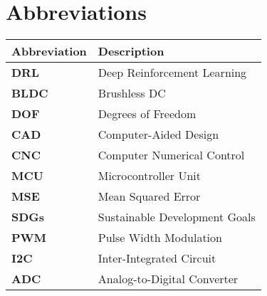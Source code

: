 \section*{Abbreviations}

\begin{longtable}[l]{p{} p{}}
    \textbf{Abbreviation} & \textbf{Description} \\
    \hline
    
    \textbf{DRL} & Deep Reinforcement Learning \\
    \textbf{BLDC} & Brushless DC \\
    \textbf{DOF} & Degrees of Freedom \\
    \textbf{CAD} & Computer-Aided Design \\
    \textbf{CNC} & Computer Numerical Control \\
    \textbf{MCU} & Microcontroller Unit \\
    \textbf{MSE} & Mean Squared Error \\
    \textbf{SDGs} & Sustainable Development Goals \\
    \textbf{PWM} & Pulse Width Modulation \\
    \textbf{I2C} & Inter-Integrated Circuit \\
    \textbf{ADC} & Analog-to-Digital Converter \\
    \hline
\end{longtable}

\clearpage